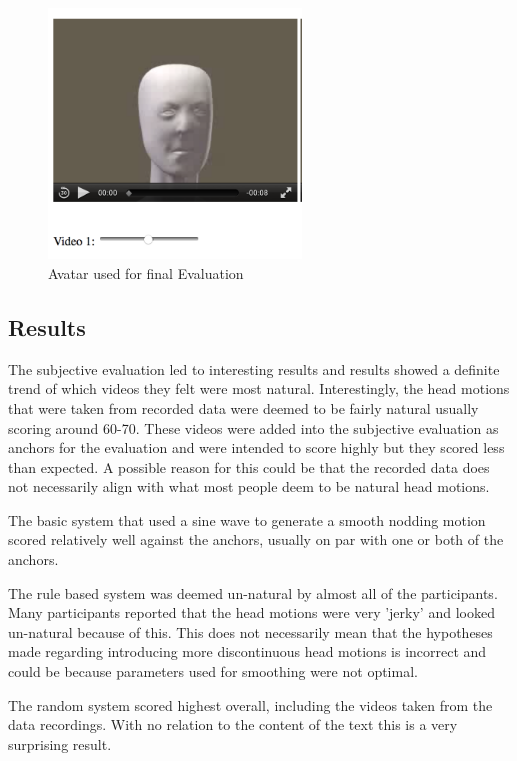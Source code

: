 \documentclass[bsc,frontabs,twoside,singlespacing,parskip]{infthesis}
\begin{document}
\begin{figure}
	\centering
	\includegraphics[width=0.6\textwidth]{eval_3.png}
	\caption{Avatar used for final Evaluation}
\end{figure}

\subsection{Results}

The subjective evaluation led to interesting results and results showed a  definite trend of which videos they felt were most natural. Interestingly, the head motions that were taken from recorded data were deemed to be fairly natural usually scoring around 60-70. These videos were added into the subjective evaluation as anchors for the evaluation and were intended to score highly but they scored less than expected. A possible reason for this could be that the recorded data does not necessarily align with what most people deem to be natural head motions.

The basic system that used a sine wave to generate a smooth nodding motion scored relatively well against the anchors, usually on par with one or both of the anchors. 

The rule based system was deemed un-natural by almost all of the participants. Many participants reported that the head motions were very 'jerky' and looked un-natural because of this. This does not necessarily mean that the hypotheses made regarding introducing more discontinuous head motions is incorrect and could be because parameters used for smoothing were not optimal.

The random system scored highest overall, including the videos taken from the data recordings. With no relation to the content of the text this is a very surprising result. 
\end{document}
